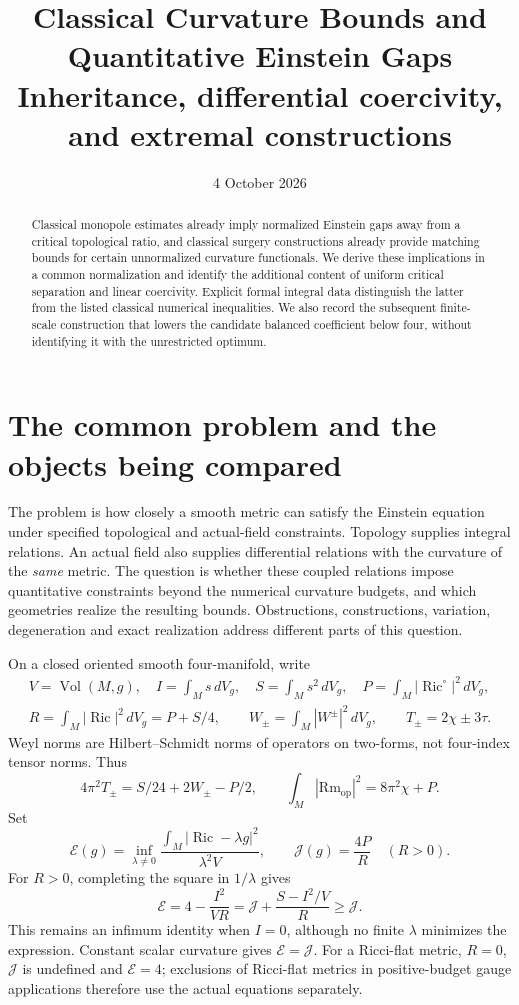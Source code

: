 \documentclass[11pt]{article}
\title{Classical Curvature Bounds and Quantitative Einstein Gaps\\
\large Inheritance, differential coercivity, and extremal constructions}
\author{}
\date{4 October 2026}
\theoremstyle{remark}
\newcommand{\Ric}{\operatorname{Ric}}
\newcommand{\Vol}{\operatorname{Vol}}
\newcommand{\E}{\mathcal E}
\newcommand{\J}{\mathcal J}
\begin{document}
\maketitle
\begin{abstract}
Classical monopole estimates already imply normalized Einstein gaps away
from a critical topological ratio, and classical surgery constructions
already provide matching bounds for certain unnormalized curvature
functionals. We derive these implications in a common normalization and
identify the additional content of uniform critical separation and linear
coercivity. Explicit formal integral data distinguish the latter from the
listed classical numerical inequalities. We also record the subsequent
finite-scale construction that lowers the candidate balanced coefficient
below four, without identifying it with the unrestricted optimum.
\end{abstract}

\section{The common problem and the objects being compared}

The problem is how closely a smooth metric can satisfy the Einstein
equation under specified topological and actual-field constraints.
Topology supplies integral relations. An actual field also supplies
differential relations with the curvature of the \emph{same} metric.
The question is whether these coupled relations impose quantitative
constraints beyond the numerical curvature budgets, and which geometries
realize the resulting bounds. Obstructions, constructions, variation,
degeneration and exact realization address different parts of this question.

On a closed oriented smooth four-manifold, write
\begin{gather}
 V=\Vol(M,g),\quad I=\int_Ms\,dV_g,\quad
 S=\int_Ms^2\,dV_g,\quad P=\int_M|\Ric^\circ|^2\,dV_g,\\
 R=\int_M|\Ric|^2\,dV_g=P+S/4,\qquad
 W_\pm=\int_M|W^\pm|^2\,dV_g,\qquad T_\pm=2\chi\pm3\tau.
\end{gather}
Weyl norms are Hilbert--Schmidt norms of operators on two-forms, not
four-index tensor norms. Thus
\begin{equation}\label{eq:cw}
 4\pi^2T_\pm=S/24+2W_\pm-P/2,
 \qquad \int_M|\mathrm{Rm}_{\mathrm{op}}|^2=8\pi^2\chi+P.
\end{equation}
Set
\begin{equation}
 \E(g)=\inf_{\lambda\ne0}
 \frac{\int_M|\Ric-\lambda g|^2}{\lambda^2V},
 \qquad \J(g)=\frac{4P}{R}\quad(R>0).
\end{equation}
For $R>0$, completing the square in $1/\lambda$ gives
\begin{equation}\label{eq:defects}
 \E=4-\frac{I^2}{VR}
     =\J+\frac{S-I^2/V}{R}\ge\J.
\end{equation}
This remains an infimum identity when $I=0$, although no finite
$\lambda$ minimizes the expression. Constant scalar curvature gives
$\E=\J$. For a Ricci-flat metric, $R=0$, $\J$ is undefined and
$\E=4$; exclusions of Ricci-flat metrics in positive-budget gauge
applications therefore use the actual equations separately.
\end{document}
